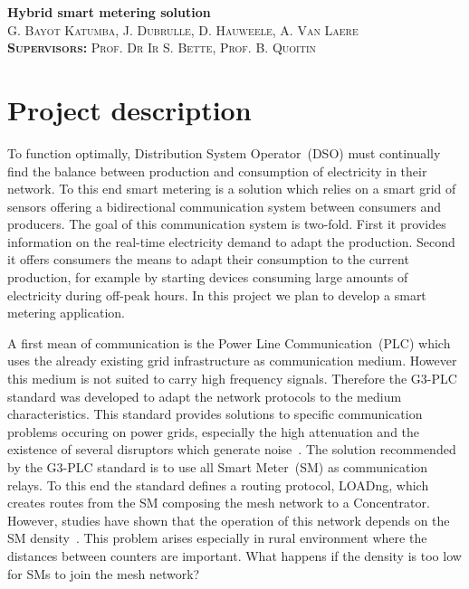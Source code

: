 \documentclass[a4paper,10pt]{article}
\begin{document}

\begin{center}
  \huge\textbf{Hybrid smart metering solution}\\
  \vspace{0.5em}
  \small\textsc{G. Bayot Katumba, J. Dubrulle, D. Hauweele, A. Van Laere}\\
  \small\textsc{\textbf{Supervisors:} Prof. Dr Ir S. Bette, Prof. B. Quoitin}
\end{center}

\section{Project description}

To function optimally, Distribution System Operator~(DSO)
must continually find the balance between production and
consumption of electricity in their network. To this end
smart metering is a solution which relies on a smart grid of
sensors offering a bidirectional communication system
between consumers and producers. The goal of this
communication system is two-fold. First it provides
information on the real-time electricity demand to adapt the
production. Second it offers consumers the means to adapt
their consumption to the current production, for example by
starting devices consuming large amounts of electricity
during off-peak hours. In this project we plan to develop a
smart metering application.

A first mean of communication is the Power Line
Communication~(PLC) which uses the already existing grid
infrastructure as communication medium. However this medium
is not suited to carry high frequency signals. Therefore the
G3-PLC standard was developed to adapt the network protocols
to the medium characteristics. This standard provides
solutions to specific communication problems occuring on
power grids, especially the high attenuation and the
existence of several disruptors which generate
noise~\cite{itu_sim2016}. The solution recommended by the
G3-PLC standard is to use all Smart Meter~(SM) as
communication relays. To this end the standard defines a
routing protocol, LOADng, which creates routes from the SM
composing the mesh network to a Concentrator. However,
studies have shown that the operation of this network
depends on the SM density~\cite{g3plc_density2015}. This
problem arises especially in rural environment where the
distances between counters are important. What happens if
the density is too low for SMs to join the mesh network?
\end{document}
